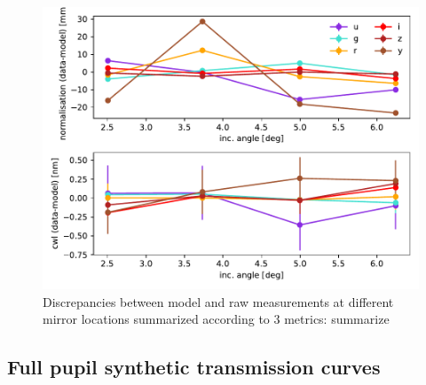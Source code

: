 \begin{figure}
  \centering
  \includegraphics[width=1\linewidth]{fig/metrics.pdf}
  \caption{Discrepancies between model and raw measurements at different mirror locations summarized according to 3 metrics: summarize}
  \label{fig:metrics}
\end{figure}

\subsection{Full pupil synthetic transmission curves}

